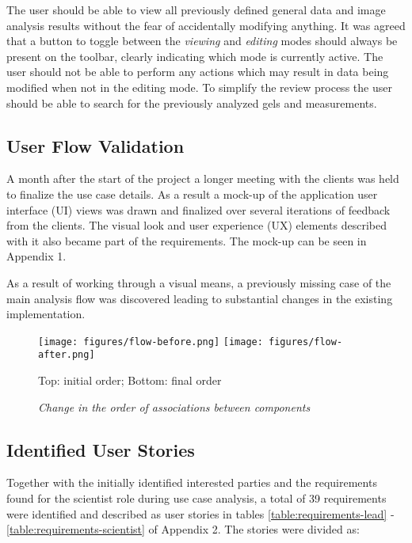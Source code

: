 The user should be able to view all previously defined general data and image analysis results without the fear of accidentally modifying anything. It was agreed that a button to toggle between the \emph{viewing} and \emph{editing} modes should always be present on the toolbar, clearly indicating which mode is currently active. The user should not be able to perform any actions which may result in data being modified when not in the editing mode. To simplify the review process the user should be able to search for the previously analyzed gels and measurements.

\subsection{User Flow Validation}

A month after the start of the project a longer meeting with the clients was held to finalize the use case details. As a result a mock-up of the application user interface (UI) views was drawn and finalized over several iterations of feedback from the clients. The visual look and user experience (UX) elements described with it also became part of the requirements. The mock-up can be seen in Appendix 1.

As a result of working through a visual means, a previously missing case of the main analysis flow was discovered leading to substantial changes in the existing implementation. 

\begin{figure}[H]
    \centering
    \texttt{[image: figures/flow-before.png]}
    \texttt{[image: figures/flow-after.png]}
    \caption[\textit{Change in the order of associations between components}]%
    {\textit{Change in the order of associations between components}}
    {\small {Top: initial order; Bottom: final order}}
    \label{fig:flow-change}
\end{figure}

\subsection{Identified User Stories}

Together with the initially identified interested parties and the requirements found for the scientist role during use case analysis, a total of 39 requirements were identified and described as user stories in tables \ref{table:requirements-lead} - \ref{table:requirements-scientist} of Appendix 2. The stories were divided as:

